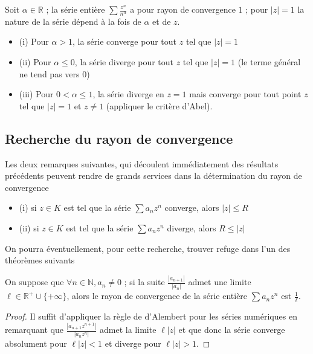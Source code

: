 \begin{example}
Soit $\alpha \in \mathbb{R}$ ; la série entière
$\sum \frac{z^n}{n^\alpha}$ a pour rayon de convergence $1$ ;
pour $|z| = 1$ la nature de la série dépend à la fois de
$\alpha$ et de $z$.

\begin{itemize}
\itemsep1pt\parskip0pt
\item
  (i) Pour $\alpha > 1$, la série converge pour tout $z$ tel que
  $|z| = 1$
\item
  (ii) Pour $\alpha \leq 0$, la série diverge pour tout $z$ tel que
  $|z| = 1$ (le terme général ne tend pas vers $0$)
\item
  (iii) Pour $0 < \alpha \leq 1$, la série diverge en $z = 1$ mais
  converge pour tout point $z$ tel que $|z| = 1$ et
  $z \neq 1$ (appliquer le critère d'Abel).
\end{itemize}
\end{example}

\subsection{Recherche du rayon de convergence}

Les deux remarques suivantes, qui découlent immédiatement des résultats
précédents peuvent rendre de grands services dans la détermination du
rayon de convergence

\begin{itemize}
\itemsep1pt\parskip0pt
\item
  (i) si $z \in K$ est tel que la série
  $\sum a_n z^n$ converge, alors $|z| \leq R$
\item
  (ii) si $z \in K$ est tel que la série
  $\sum a_n z^n$ diverge, alors $R \leq |z|$
\end{itemize}

On pourra éventuellement, pour cette recherche, trouver refuge dans l'un
des théorèmes suivants

\begin{thm}
On suppose que
$\forall n \in \mathbb{N}, a_n \neq 0$ ; si la suite 
$\frac{|a_{n+1}|}{|a_n|}$ admet
une limite $\ell \in \mathbb{R}^+ \cup \{+\infty\}$,
alors le rayon de convergence de la série entière
$\sum a_n z^n$ est $\frac{1}{\ell}$.
\end{thm}

\begin{proof}
Il suffit d'appliquer la règle de d'Alembert pour les
séries numériques en remarquant que 
$\frac{|a_{n+1} z^{n+1}|}{|a_n z^n|}$
admet la limite $\ell |z|$ et que donc la série converge
absolument pour $\ell |z| < 1$ et diverge pour
$\ell |z| > 1$.
\end{proof}


